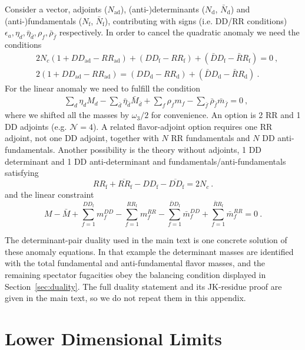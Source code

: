 \documentclass[11pt,a4paper]{article}
\numberwithin{equation}{section}
\theoremstyle{plain}
\theoremstyle{definition}
\theoremstyle{remark}
\begin{document}
Consider a vector, adjoints ($N_\text{ad}$), (anti-)determinants ($N_\text{d}$, $\bar N_\text{d}$) and (anti-)fundamentals ($N_\text{f}$, $\bar N_\text{f}$), contributing with signs (i.e. DD/RR conditions) $\epsilon_a, \eta_d,\bar\eta_{\bar d},\rho_f, \bar\rho_{\bar f}$ respectively. In order to cancel the quadratic anomaly we need the conditions
\begin{align}
& \ 2N_c (1+DD_\text{ad}-RR_\text{ad})+(DD_\text{f}-RR_\text{f})+(\bar DD_\text{f}-\bar RR_\text{f})=0~,\\
& \ 2(1+DD_\text{ad}-RR_\text{ad})=(DD_\text{d}-RR_\text{d})+(\bar DD_\text{d}-\bar RR_\text{d})~.
\end{align}
For the linear anomaly we need to fulfill the condition
\begin{align}
& 
\sum_d\eta_d M_d
-\sum_{\bar d}\bar\eta_{\bar d}\bar M_{\bar d}
+\sum_f\rho_f m_f
-\sum_{\bar f}\bar\rho_{\bar f}\bar m_{\bar f}=0~,
\end{align}
where we shifted all the masses by $\omega_3/2$ for convenience.  An option is 2 RR and 1 DD adjoints (e.g. $\mathcal{N}=4$). A related flavor-adjoint option requires one RR adjoint, not one DD adjoint, together with $N$ RR fundamentals and $N$ DD anti-fundamentals. Another possibility is the theory without adjoints, 1 DD determinant and 1 DD anti-determinant and fundamentals/anti-fundamentals satisfying
\begin{equation}
RR_\text{f}+\overline{RR}_\text{f}-DD_\text{f}-\overline{DD}_\text{f}=2N_c~.
\end{equation}
and the linear constraint 
\begin{equation}
M-\bar M+\sum_{f=1}^{DD_\text{f}} m^{DD}_f-\sum_{f=1}^{RR_\text{f}} m^{RR}_f-\sum_{f=1}^{\bar DD_\text{f}} \bar m^{DD}_f+\sum_{f=1}^{\bar RR_\text{f}} \bar m^{RR}_f=0~.
\end{equation}

The determinant-pair duality used in the main text is one concrete solution of these anomaly equations.  In that example the determinant masses are identified with the total fundamental and anti-fundamental flavor masses, and the remaining spectator fugacities obey the balancing condition displayed in Section~\ref{sec:duality}.  The full duality statement and its JK-residue proof are given in the main text, so we do not repeat them in this appendix.

\section{Lower Dimensional Limits}\label{app:dimensional-limits}
\end{document}

